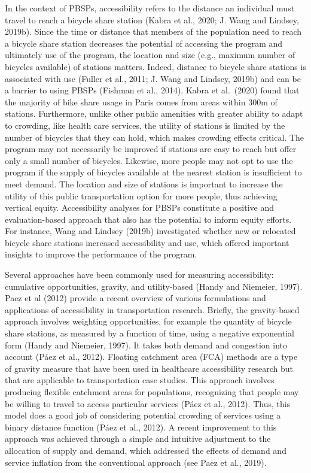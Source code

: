 \documentclass[]{elsarticle} %
\begin{document}
In the context of PBSPs, accessibility refers to the distance an
individual must travel to reach a bicycle share station (Kabra et al.,
2020; J. Wang and Lindsey, 2019b). Since the time or distance that
members of the population need to reach a bicycle share station
decreases the potential of accessing the program and ultimately use of
the program, the location and size (e.g., maximum number of bicycles
available) of stations matters. Indeed, distance to bicycle share
stations is associated with use (Fuller et al., 2011; J. Wang and
Lindsey, 2019b) and can be a barrier to using PBSPs (Fishman et al.,
2014). Kabra et al.~(2020) found that the majority of bike share usage
in Paris comes from areas within 300m of stations. Furthermore, unlike
other public amenities with greater ability to adapt to crowding, like
health care services, the utility of stations is limited by the number
of bicycles that they can hold, which makes crowding effects critical.
The program may not necessarily be improved if stations are easy to
reach but offer only a small number of bicycles. Likewise, more people
may not opt to use the program if the supply of bicycles available at
the nearest station is insufficient to meet demand. The location and
size of stations is important to increase the utility of this public
transportation option for more people, thus achieving vertical equity.
Accessibility analyses for PBSPs constitute a positive and
evaluation-based approach that also has the potential to inform equity
efforts. For instance, Wang and Lindsey (2019b) investigated whether new
or relocated bicycle share stations increased accessibility and use,
which offered important insights to improve the performance of the
program.

Several approaches have been commonly used for measuring accessibility:
cumulative opportunities, gravity, and utility-based (Handy and
Niemeier, 1997). Paez et al (2012) provide a recent overview of various
formulations and applications of accessibility in transportation
research. Briefly, the gravity-based approach involves weighting
opportunities, for example the quantity of bicycle share stations, as
measured by a function of time, using a negative exponential form (Handy
and Niemeier, 1997). It takes both demand and congestion into account
(Páez et al., 2012). Floating catchment area (FCA) methods are a type of
gravity measure that have been used in healthcare accessibility research
but that are applicable to transportation case studies. This approach
involves producing flexible catchment areas for populations, recognizing
that people may be willing to travel to access particular services (Páez
et al., 2012). Thus, this model does a good job of considering potential
crowding of services using a binary distance function (Páez et al.,
2012). A recent improvement to this approach was achieved through a
simple and intuitive adjustment to the allocation of supply and demand,
which addressed the effects of demand and service inflation from the
conventional approach (see Paez et al., 2019).
\end{document}
